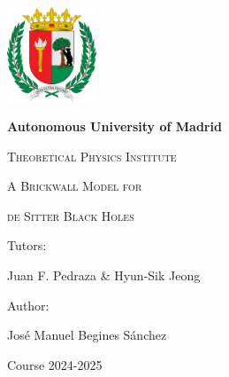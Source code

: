 \graphicspath{ {./figs/00-titlepage} }

\begin{titlepage}
    \begin{center}
        {\includegraphics[width=0.2\textwidth]{madrid.png}}

        \vspace{0.2cm}

        {\bfseries\LARGE Autonomous University of Madrid}

        \vspace{1cm}

        {\scshape\Large Theoretical Physics Institute}

        \vspace{4.5cm}

        {\scshape\Huge A Brickwall Model for }

        \vspace{0.4cm}

        {\scshape\Huge de Sitter Black Holes}

        \vfill
        {\Large Tutors:}

        \vspace{0.2cm}
        
        {\Large Juan F. Pedraza \& Hyun-Sik Jeong}

        \vspace{0.6cm}

        {\Large Author:}

        \vspace{0.2cm}

        {\Large José Manuel Begines Sánchez}

        \vspace{2cm}

        {\Large Course 2024-2025}
    \end{center}
\end{titlepage}
